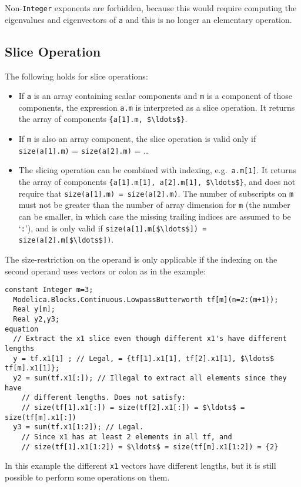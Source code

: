\begin{nonnormative}
Non-\lstinline!Integer! exponents are forbidden, because this would require
computing the eigenvalues and eigenvectors of \lstinline!a! and this is no
longer an elementary operation.
\end{nonnormative}

\subsection{Slice Operation}\label{slice-operation}

The following holds for slice operations:
\begin{itemize}
\item
  If \lstinline!a! is an array containing scalar components and \lstinline!m! is a component of those components, the expression \lstinline!a.m! is interpreted as a
  slice operation.  It returns the array of components \lstinline!{a[1].m, $\ldots$}!.
\item
  If \lstinline!m! is also an array component, the slice operation is valid only if \lstinline!size(a[1].m)! = \lstinline!size(a[2].m)! = \ldots
\item
  The slicing operation can be combined with indexing, e.g.\ \lstinline!a.m[1]!.  It returns the array of components \lstinline!{a[1].m[1], a[2].m[1], $\ldots$}!,
  and does not require that \lstinline!size(a[1].m) = size(a[2].m)!.  The number of subscripts on \lstinline!m! must not be greater than the number of array dimension
  for \lstinline!m! (the number can be smaller, in which case the missing trailing indices are assumed to be `\lstinline!:!'), and is only valid if
  \lstinline!size(a[1].m[$\ldots$]) = size(a[2].m[$\ldots$])!.
\end{itemize}

\begin{example}
The size-restriction on the operand is only applicable if the indexing on the second operand uses vectors or colon as in the example:
\begin{lstlisting}[language=modelica]
  constant Integer m=3;
  Modelica.Blocks.Continuous.LowpassButterworth tf[m](n=2:(m+1));
  Real y[m];
  Real y2,y3;
equation
  // Extract the x1 slice even though different x1's have different lengths
  y = tf.x1[1] ; // Legal, = {tf[1].x1[1], tf[2].x1[1], $\ldots$ tf[m].x1[1]};
  y2 = sum(tf.x1[:]); // Illegal to extract all elements since they have
    // different lengths. Does not satisfy:
    // size(tf[1].x1[:]) = size(tf[2].x1[:]) = $\ldots$ = size(tf[m].x1[:])
  y3 = sum(tf.x1[1:2]); // Legal.
    // Since x1 has at least 2 elements in all tf, and
    // size(tf[1].x1[1:2]) = $\ldots$ = size(tf[m].x1[1:2]) = {2}
\end{lstlisting}
In this example the different \lstinline!x1! vectors have different lengths,
but it is still possible to perform some operations on them.
\end{example}

